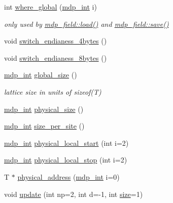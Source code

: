 \begin{DoxyCompactItemize}
int \hyperlink{classmdp__field_ac8422b94f444285b0d34748ed6b7c06f}{where\_\-global} (\hyperlink{mdp__global__vars_8h_aaa1ad9d0dcd2124aa5af0120d9954174}{mdp\_\-int} i)
\begin{DoxyCompactList}\small\item\em only used by \hyperlink{classmdp__field_a21ce8e89744a826abdc9f5325c714892}{mdp\_\-field::load()} and \hyperlink{classmdp__field_a66bbe9d66cc3ad2a5955282df3519471}{mdp\_\-field::save()} \item\end{DoxyCompactList}\item 
void \hyperlink{classmdp__field_ac9f44455cd31baa03e00ca5b601f199c}{switch\_\-endianess\_\-4bytes} ()
\item 
void \hyperlink{classmdp__field_a8db821b09a101730bcbcf27ccd1a25f5}{switch\_\-endianess\_\-8bytes} ()
\item 
\hyperlink{mdp__global__vars_8h_aaa1ad9d0dcd2124aa5af0120d9954174}{mdp\_\-int} \hyperlink{classmdp__field_a4deb091e1da25d239e206ee8ff64ae11}{global\_\-size} ()
\begin{DoxyCompactList}\small\item\em lattice size in units of sizeof(T) \item\end{DoxyCompactList}\item 
\hyperlink{mdp__global__vars_8h_aaa1ad9d0dcd2124aa5af0120d9954174}{mdp\_\-int} \hyperlink{classmdp__field_a0f6da321ba9bdae3a571dbbe5087d799}{physical\_\-size} ()
\item 
\hyperlink{mdp__global__vars_8h_aaa1ad9d0dcd2124aa5af0120d9954174}{mdp\_\-int} \hyperlink{classmdp__field_a0fc58cc1e14667b4ad3638baab91f28a}{size\_\-per\_\-site} ()
\item 
\hyperlink{mdp__global__vars_8h_aaa1ad9d0dcd2124aa5af0120d9954174}{mdp\_\-int} \hyperlink{classmdp__field_a58b111a6f42e6b3807c6e333fc080020}{physical\_\-local\_\-start} (int i=2)
\item 
\hyperlink{mdp__global__vars_8h_aaa1ad9d0dcd2124aa5af0120d9954174}{mdp\_\-int} \hyperlink{classmdp__field_afc3c5a4aa6512d4b99f08ae58d7e50a7}{physical\_\-local\_\-stop} (int i=2)
\item 
T $\ast$ \hyperlink{classmdp__field_a345bb93496b3154b4349878d02ab0a2a}{physical\_\-address} (\hyperlink{mdp__global__vars_8h_aaa1ad9d0dcd2124aa5af0120d9954174}{mdp\_\-int} i=0)
\item 
void \hyperlink{classmdp__field_a72b973da706841ea58dc728345d36795}{update} (int np=2, int d=-\/1, int \hyperlink{classmdp__field_a3dfa0ff545bed811ad055e46020bed7f}{size}=1)

\end{DoxyCompactItemize}
